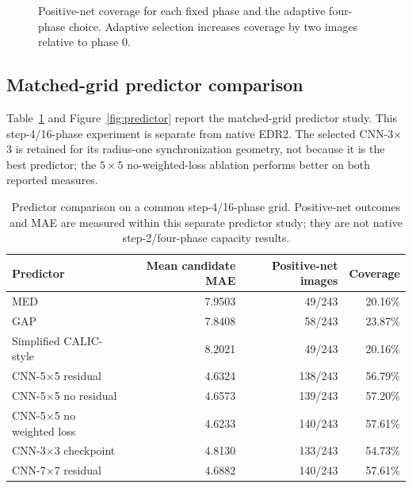 \documentclass[preprint,12pt,a4paper]{elsarticle}
\begin{document}
\begin{figure}[t]
\centering
{}
\caption{Positive-net coverage for each fixed phase and the adaptive four-phase choice. Adaptive selection increases coverage by two images relative to phase 0.}
\label{fig:phase-results}
\end{figure}

\subsection{Matched-grid predictor comparison}

Table~\ref{tab:predictors} and Figure~\ref{fig:predictor} report the matched-grid predictor study. This step-4/16-phase experiment is separate from native EDR2. The selected CNN-3$\times$3 is retained for its radius-one synchronization geometry, not because it is the best predictor; the $5\times5$ no-weighted-loss ablation performs better on both reported measures.

\begin{table}[t]
\centering
\caption{Predictor comparison on a common step-4/16-phase grid. Positive-net outcomes and MAE are measured within this separate predictor study; they are not native step-2/four-phase capacity results.}
\label{tab:predictors}
\small
\begin{tabular}{lrrr}
\toprule
Predictor & Mean candidate MAE & Positive-net images & Coverage\\
\midrule
MED & 7.9503 & 49/243 & 20.16\%\\
GAP & 7.8408 & 58/243 & 23.87\%\\
Simplified CALIC-style & 8.2021 & 49/243 & 20.16\%\\
CNN-5$\times$5 residual & 4.6324 & 138/243 & 56.79\%\\
CNN-5$\times$5 no residual & 4.6573 & 139/243 & 57.20\%\\
CNN-5$\times$5 no weighted loss & 4.6233 & 140/243 & 57.61\%\\
CNN-3$\times$3 checkpoint & 4.8130 & 133/243 & 54.73\%\\
CNN-7$\times$7 residual & 4.6882 & 140/243 & 57.61\%\\
\bottomrule
\end{tabular}
\end{table}
\end{document}
